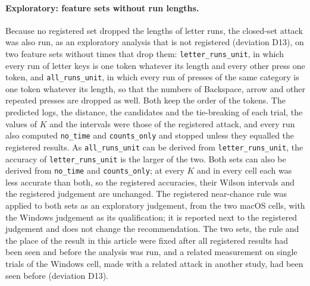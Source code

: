 \paragraph{Exploratory: feature sets without run lengths.} Because no registered set dropped the lengths of letter
runs, the closed-set attack was also run, as an exploratory analysis that is not registered (deviation D13), on two
feature sets without times that drop them: \texttt{letter\_runs\_unit}, in which every run of letter keys is one token
whatever its length and every other press one token, and \texttt{all\_runs\_unit}, in which every run of presses of the
same category is one token whatever its length, so that the numbers of Backspace, arrow and other repeated presses are
dropped as well. Both keep the order of the tokens. The predicted logs, the distance, the candidates and the
tie-breaking of each trial, the values of $K$ and the intervals were those of the registered attack, and every run also
computed \texttt{no\_time} and \texttt{counts\_only} and stopped unless they equalled the registered results. As
\texttt{all\_runs\_unit} can be derived from \texttt{letter\_runs\_unit}, the accuracy of \texttt{letter\_runs\_unit}
is the larger of the two. Both sets can also be derived from \texttt{no\_time} and \texttt{counts\_only}; at every $K$
and in every cell each was less accurate than both, so the registered accuracies, their Wilson intervals and the
registered judgement are unchanged. The registered near-chance rule was applied to both sets as an exploratory judgement, from
the two macOS cells, with the Windows judgement as its qualification; it is reported next to the registered judgement
and does not change the recommendation. The two sets, the rule and the place of the result in this article were fixed
after all registered results had been seen and before the analysis was run, and a related measurement on single trials
of the Windows cell, made with a related attack in another study, had been seen before (deviation D13).


